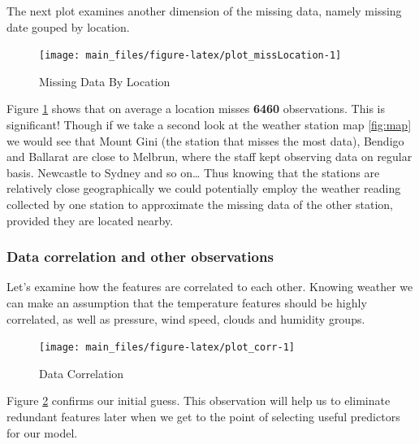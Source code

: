 The next plot examines another dimension of the missing data, namely
missing date gouped by location.

\begin{Schunk}
\begin{figure}[H]

{\centering \texttt{[image: main\_files/figure-latex/plot\_missLocation-1]} 

}

\caption[Missing Data By Location]{Missing Data By Location}\label{fig:plot_missLocation}
\end{figure}
\end{Schunk}

Figure \ref{fig:plot_missLocation} shows that on average a location
misses \textbf{6460} observations. This is significant! Though if we
take a second look at the weather station map \ref{fig:map} we would see
that Mount Gini (the station that misses the most data), Bendigo and
Ballarat are close to Melbrun, where the staff kept observing data on
regular basis. Newcastle to Sydney and so on\ldots{} Thus knowing that
the stations are relatively close geographically we could potentially
employ the weather reading collected by one station to approximate the
missing data of the other station, provided they are located nearby.

\hypertarget{data-correlation-and-other-observations}{%
\subsubsection{Data correlation and other
observations}\label{data-correlation-and-other-observations}}

Let's examine how the features are correlated to each other. Knowing
weather we can make an assumption that the temperature features should
be highly correlated, as well as pressure, wind speed, clouds and
humidity groups.

\begin{Schunk}
\begin{figure}[H]

{\centering \texttt{[image: main\_files/figure-latex/plot\_corr-1]} 

}

\caption[Data Correlation]{Data Correlation}\label{fig:plot_corr}
\end{figure}
\end{Schunk}

Figure \ref{fig:plot_corr} confirms our initial guess. This observation
will help us to eliminate redundant features later when we get to the
point of selecting useful predictors for our model.

